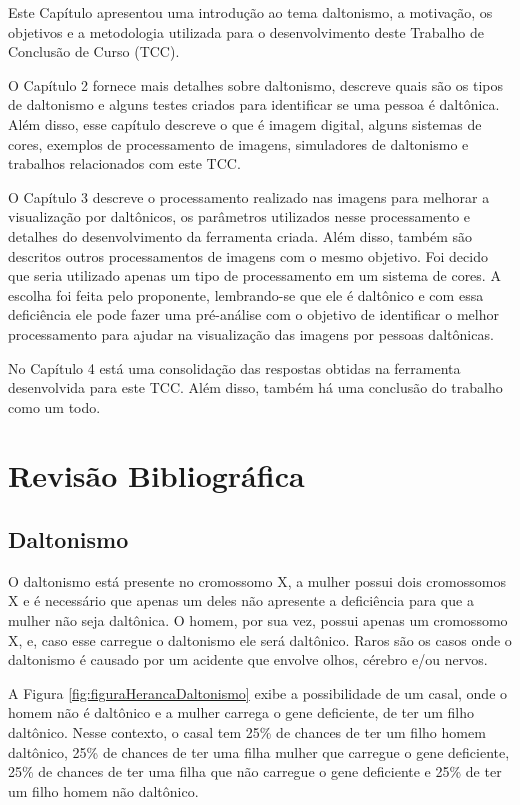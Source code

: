 \documentclass[	12pt, Times, openright, twoside, a4paper, english, brazil]{abntex2}
\begin{document}
Este Capítulo apresentou uma introdução ao tema daltonismo, a motivação, os objetivos e a metodologia utilizada para o desenvolvimento deste Trabalho de Conclusão de Curso (TCC).

O Capítulo 2 fornece mais detalhes sobre daltonismo, descreve quais são os tipos de daltonismo e alguns testes criados para identificar se uma pessoa é daltônica. Além disso, esse capítulo descreve o que é imagem digital, alguns sistemas de cores, exemplos de processamento de imagens, simuladores de daltonismo e trabalhos relacionados com este TCC.

O Capítulo 3 descreve o processamento realizado nas imagens para melhorar a visualização por daltônicos, os parâmetros utilizados nesse processamento e detalhes do desenvolvimento da ferramenta criada. 
Além disso, também são descritos outros processamentos de imagens com o mesmo objetivo. Foi decido que seria utilizado apenas um tipo de processamento em um sistema de cores. A escolha foi feita pelo proponente, lembrando-se que ele é daltônico e com essa deficiência ele pode fazer uma pré-análise com o objetivo de identificar o melhor processamento para ajudar na visualização das imagens por pessoas daltônicas.

No Capítulo 4 está uma consolidação das respostas obtidas na ferramenta desenvolvida para este TCC. Além disso, também há uma conclusão do trabalho como um todo.

\chapter{Revisão Bibliográfica}
\label{chap:revisao}
\section{Daltonismo}

O daltonismo está presente no cromossomo X, a mulher possui dois cromossomos X e é necessário que apenas um deles não apresente a deficiência para que a mulher não seja daltônica. O homem, por sua vez, possui apenas um cromossomo X, e, caso esse carregue o daltonismo ele será daltônico. Raros são os casos onde o daltonismo é causado por um acidente que envolve olhos, cérebro e/ou nervos.

A Figura \ref{fig:figuraHerancaDaltonismo} exibe a possibilidade de um casal, onde o homem não é daltônico e a mulher carrega o gene deficiente, de ter um filho daltônico. Nesse contexto, o casal tem 25\% de chances de ter um filho homem daltônico, 25\% de chances de ter uma filha mulher que carregue o gene deficiente, 25\% de chances de ter uma filha que não carregue o gene deficiente e 25\% de ter um filho homem não daltônico.
\end{document}
